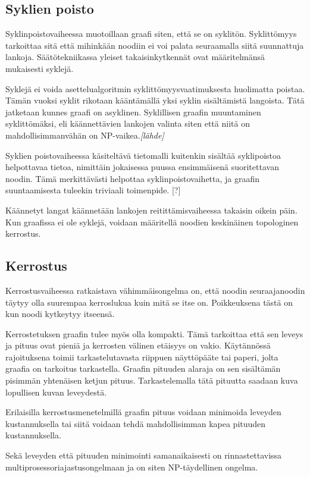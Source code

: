 \documentclass[finnish,12pt]{article}
\begin{document}
		\subsection{Syklien poisto}

Syklinpoistovaiheessa muotoillaan graafi siten, että se on syklitön.
Syklittömyys tarkoittaa sitä että mihinkään noodiin ei voi palata seuraamalla siitä suunnattuja lankoja.
Säätötekniikassa yleiset takaisinkytkennät ovat määritelmänsä mukaisesti syklejä.

Syklejä ei voida asettelualgoritmin syklittömyysvaatimuksesta huolimatta poistaa.
Tämän vuoksi syklit rikotaan kääntämällä yksi syklin sisältämistä langoista.
Tätä jatketaan kunnes graafi on asyklinen.
Syklillisen graafin muuntaminen syklittömäksi, eli käännettävien lankojen valinta siten että niitä on mahdollisimmanvähän on NP-vaikea.\emph{[lähde]}

Syklien poistovaiheessa käsiteltävä tietomalli kuitenkin sisältää syklipoistoa helpottavaa tietoa, nimittäin jokaisessa puussa ensimmäisenä suoritettavan noodin. Tämä merkittävästi helpottaa syklinpoistovaihetta, ja graafin suuntaamisesta tuleekin triviaali toimenpide. [?]

Käännetyt langat käännetään lankojen reitittämisvaiheessa takaisin oikein päin.
Kun graafissa ei ole syklejä, voidaan määritellä noodien keskinäinen topologinen kerrostus.

		\subsection{Kerrostus}

Kerrostusvaiheessa ratkaistava vähimmäisongelma on, että noodin seuraajanoodin täytyy olla suurempaa kerroslukua kuin mitä se itse on.
Poikkeuksena tästä on kun noodi kytkeytyy itseensä.

Kerrostetuksen graafin tulee myös olla kompakti. Tämä tarkoittaa että sen leveys ja pituus ovat pieniä ja kerrosten välinen etäisyys on vakio. 
Käytännössä rajoituksena toimii tarkastelutavasta riippuen näyttöpääte tai paperi, jolta graafia on tarkoitus tarkastella.
Graafin pituuden alaraja on sen sisältämän pisimmän yhtenäisen ketjun pituus. Tarkastelemalla tätä pituutta saadaan kuva lopullisen kuvan leveydestä.

Erilaisilla kerrostusmenetelmillä graafin pituus voidaan minimoida leveyden kustannuksella tai siitä voidaan tehdä mahdollisimman kapea pituuden kustannuksella.

Sekä leveyden että pituuden minimointi samanaikaisesti on rinnastettavissa multiprosessoriajastusongelmaan ja on siten NP-täydellinen ongelma. \cite{RefWorks:39}
\end{document}
